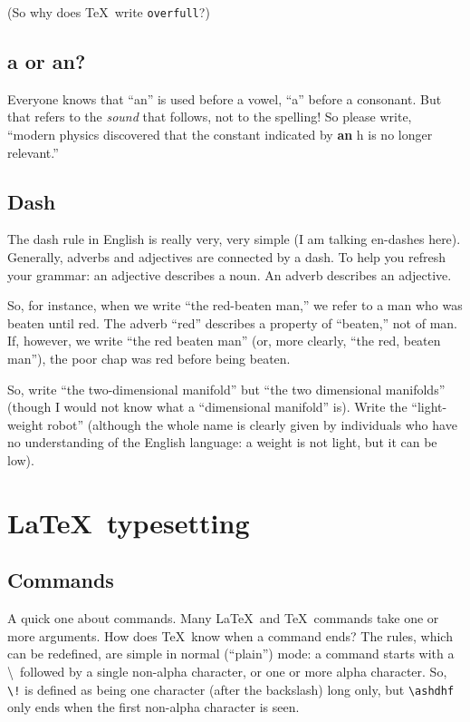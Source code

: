 \documentclass{article}
\begin{document}
(So why does \TeX\ write \verb+overfull+?)

\subsection{a or an?}
Everyone knows that ``an'' is used before a vowel, ``a'' before a consonant.  But that refers to the
\textsl{sound} that follows, not to the spelling!  So please write, ``modern physics discovered that
the constant indicated by \textbf{an} h is no longer relevant.''


\subsection{Dash}
The dash rule in English is really very, very simple (I am talking en-dashes here).  Generally, adverbs and adjectives are connected by a dash.  To help you refresh your grammar: an adjective describes a noun.  An adverb describes an adjective.

So, for instance, when we write ``the red-beaten man,'' we refer to a man who was beaten until red.  The adverb ``red'' describes a property of ``beaten,'' not of man.  If, however, we write ``the red beaten man'' (or, more clearly, ``the red, beaten man''), the poor chap was red before being beaten.

So, write ``the two-dimensional manifold'' but ``the two dimensional manifolds'' (though I would not know what a ``dimensional manifold'' is).  Write the ``light-weight robot'' (although the whole name is clearly given by individuals who have no understanding of the English language: a weight is not light, but it can be low).


\section{\LaTeX\ typesetting}
\subsection{Commands}
A quick one about commands.  Many \LaTeX\ and \TeX\ commands take one or more 
arguments. How does \TeX\ know when a command ends? The rules, which can be
redefined, are simple in normal (``plain'') mode:
	a command starts with a \textbackslash\ followed by a single
  	non-alpha character, or one or more alpha character.  So,
	\verb+\!+ is defined as being one character (after the backslash)
	long only, but \verb+\ashdhf+ only ends when the first non-alpha
	character is seen.
\end{document}
